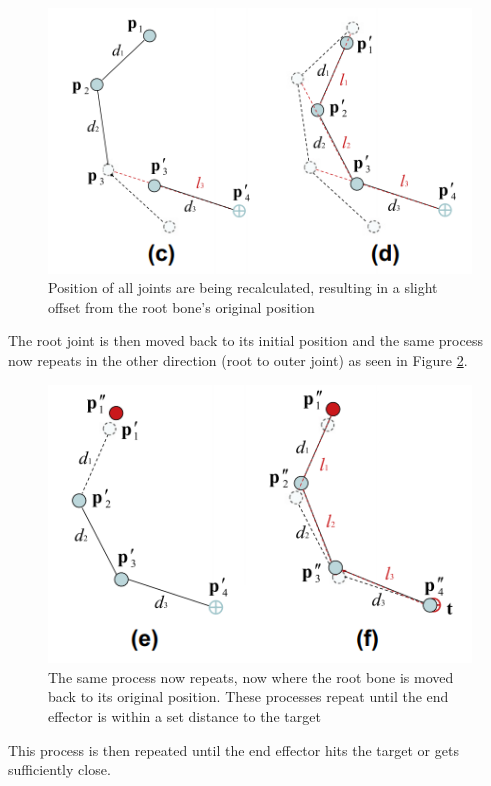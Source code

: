 \begin{figure}[H]
\centering
\includegraphics[width=1\textwidth]{FABRIK/cd}
\caption{Position of all joints are being recalculated, resulting in a slight offset from the root bone's original position}
\label{fig:cd}
\end{figure}

The root joint is then moved back to its initial position and the same process now repeats in the other direction (root to outer joint) as seen in Figure \ref{fig:ef}.

\begin{figure}[H]
 \centering
 \includegraphics[width=1\textwidth]{FABRIK/ef}
 \caption{The same process now repeats, now where the root bone is moved back to its original position. These processes repeat until the end effector is within a set distance to the target}
 \label{fig:ef}
 \end{figure}
  
This process is then repeated until the end effector hits the target or gets sufficiently close. 

